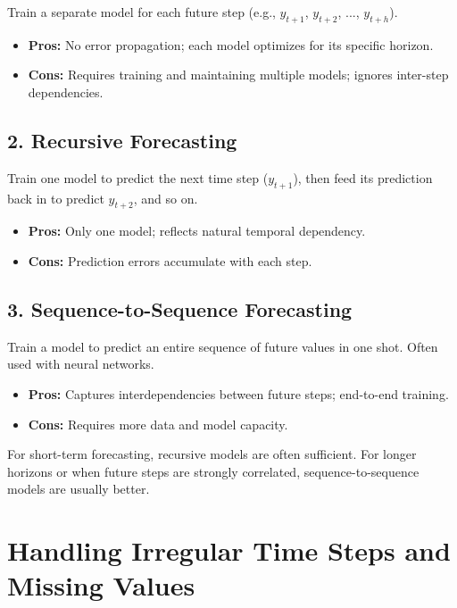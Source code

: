 \documentclass[12pt,openany, draft]{book}
\begin{document}
Train a separate model for each future step (e.g., $y_{t+1}$, $y_{t+2}$, ..., $y_{t+h}$).

\begin{itemize}
    \item \textbf{Pros:} No error propagation; each model optimizes for its specific horizon.
    \item \textbf{Cons:} Requires training and maintaining multiple models; ignores inter-step dependencies.
\end{itemize}

\subsection*{2. Recursive Forecasting}

Train one model to predict the next time step ($y_{t+1}$), then feed its prediction back in to predict $y_{t+2}$, and so on.

\begin{itemize}
    \item \textbf{Pros:} Only one model; reflects natural temporal dependency.
    \item \textbf{Cons:} Prediction errors accumulate with each step.
\end{itemize}

\subsection*{3. Sequence-to-Sequence Forecasting}

Train a model to predict an entire sequence of future values in one shot. Often used with neural networks.

\begin{itemize}
    \item \textbf{Pros:} Captures interdependencies between future steps; end-to-end training.
    \item \textbf{Cons:} Requires more data and model capacity.
\end{itemize}

\begin{notebox}
For short-term forecasting, recursive models are often sufficient. For longer horizons or when future steps are strongly correlated, sequence-to-sequence models are usually better.
\end{notebox}



\section{Handling Irregular Time Steps and Missing Values}
\end{document}
